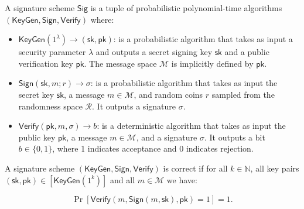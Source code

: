 \begin{definition}\label{def:signaturescheme}
A signature scheme $\mathsf{Sig}$ is a tuple of probabilistic polynomial-time algorithms $(\mathsf{KeyGen}, \mathsf{Sign}, \mathsf{Verify})$ where:

\begin{itemize}
    \item $\mathsf{KeyGen}(1^\lambda) \rightarrow (\mathsf{sk}, \mathsf{pk})$: is a probabilistic algorithm that takes as input a security parameter $\lambda$ and outputs a secret signing key $\mathsf{sk}$ and a public verification key $\mathsf{pk}$. The message space $\mathcal{M}$ is implicitly defined by $\mathsf{pk}$.
    
    \item $\mathsf{Sign}(\mathsf{sk}, m; r) \rightarrow \sigma$: is a probabilistic algorithm that takes as input the secret key $\mathsf{sk}$, a message $m \in \mathcal{M}$, and random coins $r$ sampled from the randomness space $\mathcal{R}$. It outputs a signature $\sigma$.
    
    \item $\mathsf{Verify}(\mathsf{pk}, m, \sigma) \rightarrow b$: is a deterministic algorithm that takes as input the public key $\mathsf{pk}$, a message $m \in \mathcal{M}$, and a signature $\sigma$. It outputs a bit $b \in \{0,1\}$, where 1 indicates acceptance and 0 indicates rejection.
\end{itemize}
\end{definition}

\begin{definition}[Correctness]
A signature scheme $(\mathsf{KeyGen}, \mathsf{Sign}, \mathsf{Verify})$ is correct if for all $k \in \mathbb{N}$, all key pairs $(\mathsf{sk}, \mathsf{pk}) \in [\mathsf{KeyGen}(1^k)]$ and all $m \in \mathcal{M}$ we have:

$$\Pr[\mathsf{Verify}(m, \mathsf{Sign}(m, \mathsf{sk}), \mathsf{pk}) = 1] = 1.$$
\end{definition}

